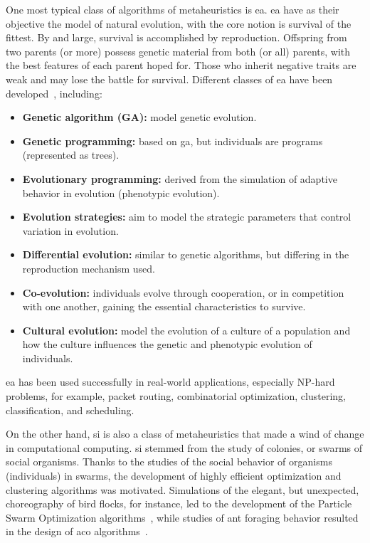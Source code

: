 One most typical class of algorithms of metaheuristics is \gls{ea}. \gls{ea} have as their objective the model of natural evolution, with the core notion is survival of the fittest. By and large, survival is accomplished by reproduction. Offspring from two parents (or more) possess genetic material from both (or all) parents, with the best features of each parent hoped for. Those who inherit negative traits are weak and may lose the battle for survival. Different classes of \gls{ea} have been developed~\cite{engelbrecht2007computational, brabazon2015natural}, including:
\begin{itemize}
	\item \textbf{Genetic algorithm (GA):} model genetic evolution.
	\item \textbf{Genetic programming:} based on \gls{ga}, but individuals are programs (represented as trees).
	\item \textbf{Evolutionary programming:} derived from the simulation of adaptive behavior in evolution (phenotypic evolution).
	\item \textbf{Evolution strategies:} aim to model the strategic parameters that control variation in evolution. 
	\item \textbf{Differential evolution:} similar to genetic algorithms, but differing in the reproduction mechanism used. 
	\item \textbf{Co-evolution:} individuals evolve through cooperation, or in competition with one another, gaining the essential characteristics to survive.
	\item \textbf{Cultural evolution:} model the evolution of a culture of a population and how the culture influences the genetic and phenotypic evolution of individuals. 
\end{itemize}
\gls{ea} has been used successfully in real-world applications, especially NP-hard problems, for example, packet routing, combinatorial optimization, clustering, classification, and scheduling. 

On the other hand, \gls{si} is also a class of metaheuristics that made a wind of change in computational computing. \gls{si} stemmed from the study of colonies, or swarms of social organisms. Thanks to the studies of the social behavior of organisms (individuals) in swarms, the development of highly efficient optimization and clustering algorithms was motivated. Simulations of the elegant, but unexpected, choreography of bird flocks, for instance, led to the development of the Particle Swarm Optimization algorithms~\cite{poli2007particle}, while studies of ant foraging behavior resulted in the design of \gls{aco} algorithms~\cite{parsons2005ant}.